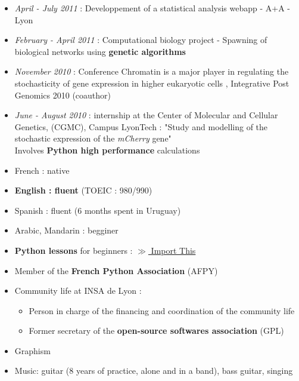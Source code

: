 \begin{itemize}
\renewcommand{\labelitemi}{$\circ$}
	\item \emph{April - July 2011} : Developpement of a statistical analysis webapp - A+A - Lyon
	\item \textit{February - April 2011} : Computational biology project - Spawning of biological networks using \textbf{genetic algorithms}
    \item \textit{November 2010} : Conference \og Chromatin is a major player in regulating the stochasticity of gene expression in higher eukaryotic cells \fg{}, Integrative Post Genomics 2010 (coauthor)
    \item \textit{June - August 2010} : internship at the Center of Molecular and Cellular Genetics, (CGMC), Campus LyonTech : "Study and modelling of the stochastic expression of the \textit{mCherry} gene" \\Involves \textbf{Python high performance} calculations
\end{itemize}


    \begin{itemize}
    \renewcommand{\labelitemi}{$\circ$}
    \item French : native
    \item \textbf{English : fluent} (TOEIC : 980/990)
    \item Spanish : fluent (6 months spent in Uruguay) 
    \item Arabic, Mandarin : begginer
\end{itemize}
    
\begin{itemize}
\renewcommand{\labelitemi}{$\circ$}
	\item \textbf{Python lessons} for beginners : \href{http://importthis.tumblr.com}{$\gg$ Import This}
	\item Member of the \textbf{French Python Association} (AFPY) 
	\item Community life at INSA de Lyon :
	\begin{itemize}
		\item Person in charge of the financing and coordination of the community life
		\item Former secretary of the \textbf{open-source softwares association} (GPL) 
	\end{itemize}
    \item Graphism
    \item Music: guitar (8 years of practice, alone and in a band), bass guitar, singing    
\end{itemize}



